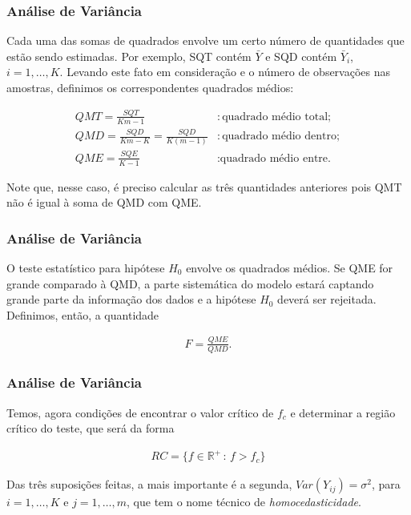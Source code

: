 \documentclass{beamer}
\begin{document}
\begin{frame}
\frametitle{Análise de Variância}
Cada uma das somas de quadrados envolve um certo número de quantidades que estão sendo estimadas. Por exemplo, SQT contém \(\bar{Y}\) e SQD contém \(\bar{Y}_i\), \(i=1,\ldots,K\). Levando este fato em consideração e o número de observações nas amostras, definimos os correspondentes quadrados médios:

\begin{align*}
QMT = \frac{SQT}{Km-1} &: \text{quadrado médio total}; \\
QMD = \frac{SQD}{Km-K} = \frac{SQD}{K(m-1)} &: \text{quadrado médio dentro}; \\
QME = \frac{SQE}{K-1} &: \text{quadrado médio entre.}
\end{align*}

Note que, nesse caso, é preciso calcular as três quantidades anteriores pois QMT não é igual à soma de QMD com QME.

\end{frame}


\begin{frame}
\frametitle{Análise de Variância}
O teste estatístico para hipótese \(H_0\) envolve os quadrados médios. Se QME for grande comparado à QMD, a parte sistemática do modelo estará captando grande parte da informação dos dados e a hipótese \(H_0\) deverá ser rejeitada. Definimos, então, a quantidade

\begin{align*}
F = \frac{QME}{QMD}.
\end{align*}

\end{frame}

\begin{frame}
\frametitle{Análise de Variância}
Temos, agora condições de encontrar o valor crítico de \(f_c\) e determinar a região crítico do teste, que será da forma

\begin{align*}
RC = \{f \in \mathbb{R}^+ \, : \, f > f_c \}
\end{align*}

Das três suposições feitas, a mais importante é a segunda, \(Var(Y_{ij}) = \sigma^2\), para \(i=1,\ldots,K\) e \(j=1,\ldots,m\), que tem o nome técnico de \textit{homocedasticidade}. 
 
\end{frame}
\end{document}
